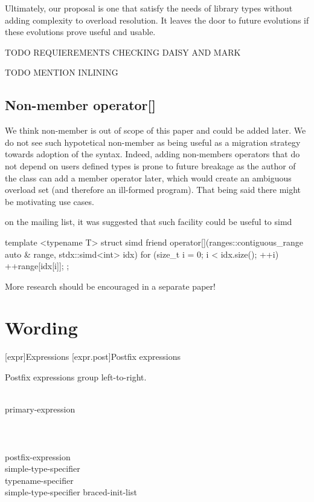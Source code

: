 \documentclass{wg21}
\begin{document}
% 

Ultimately, our proposal is one that satisfy the needs of library types without adding complexity to overload resolution.
It leaves the door to future evolutions if these evolutions prove useful and usable.

TODO REQUIEREMENTS CHECKING DAISY AND MARK

TODO MENTION INLINING

\subsection{Non-member operator[]}

We think non-member  is out of scope of this paper and could be added later.
We do not see such hypotetical non-member  as being useful as a migration strategy towards adoption of the \tcode{[]} syntax.
Indeed, adding non-members operators that do not depend on users defined types is prone to future breakage as the author of the class can add
a member operator later, which would create an ambiguous overload set (and therefore an ill-formed program).
That being said there might be motivating use cases.

on the mailing list,
it was suggested that such facility could be useful to simd

\begin{colorblock}
template <typename T>
struct simd
{
    friend operator[](ranges::contiguous_range auto & range, stdx::simd<int> idx)
    {
        for (size_t i = 0; i < idx.size(); ++i)
            ++range[idx[i]];
    }
};

\end{colorblock}

More research should be encouraged in a separate paper!

\section{Wording}

[expr]{Expressions}
[expr.post]{Postfix expressions}%

\pnum
Postfix expressions group left-to-right.

\begin{bnf}
\\
primary-expression\\
\\
\\
\\
postfix-expression \terminal{(}  \terminal{)}\\
simple-type-specifier \terminal{(}  \terminal{)}\\
typename-specifier \terminal{(}  \terminal{)}\\
simple-type-specifier braced-init-list\\
\end{bnf}
\end{document}
